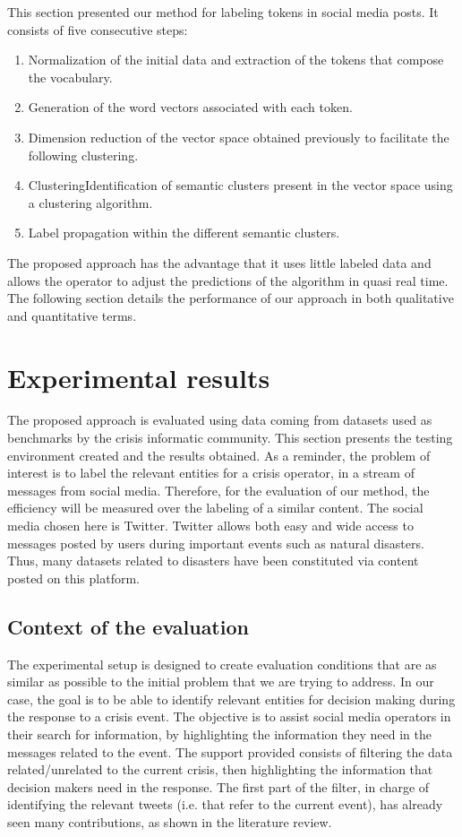 This section presented our method for labeling tokens in social media posts.
It consists of five consecutive steps:
\begin{enumerate}
    \item Normalization of the initial data and extraction of the tokens that compose the vocabulary.
    \item Generation of the word vectors associated with each token.
    \item Dimension reduction of the vector space obtained previously to facilitate the following clustering.
    \item ClusteringIdentification of semantic clusters present in the vector space using a clustering algorithm.
    \item Label propagation within the different semantic clusters.
\end{enumerate}
The proposed approach has the advantage that it uses little labeled data and allows the
operator to adjust the predictions of the algorithm in quasi real time.
The following section details the performance of our approach in both qualitative and quantitative terms.

\section{Experimental results}
The proposed approach is evaluated using data coming from datasets used as benchmarks
by the crisis informatic community.
This section presents the testing environment created and the results obtained.
As a reminder, the problem of interest is to label the relevant entities for a crisis operator, in a stream of messages from social media.
Therefore, for the evaluation of our method, the efficiency will be measured over the labeling of a similar content.
The social media chosen here is Twitter.
Twitter allows both easy and wide access to messages posted by users during important events such as natural disasters.
Thus, many datasets related to disasters have been constituted via content posted on this platform.

\subsection{Context of the evaluation}
The experimental setup is designed to create evaluation conditions that are as similar as possible to the initial problem that we are trying to address.
In our case, the goal is to be able to identify relevant entities for decision making during the response to a crisis event.
The objective is to assist social media operators in their search for information, by highlighting the information they need in the messages related to the event.
The support provided consists of filtering the data related/unrelated to the current crisis, then highlighting the information that decision makers need in the response.
The first part of the filter, in charge of identifying the relevant tweets (i.e. that refer to the current event), has already seen many contributions, as shown in the literature review.


